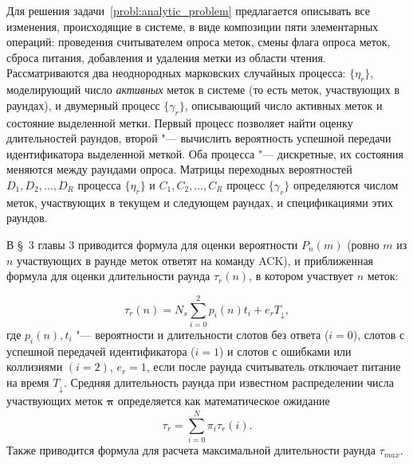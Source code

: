 Для решения задачи~\ref{probl:analytic_problem} предлагается описывать все изменения, происходящие в системе, в виде композиции пяти элементарных операций: проведения считывателем опроса меток, смены флага опроса меток, сброса питания, добавления и удаления метки из области чтения. Рассматриваются два неоднородных марковских случайных процесса: $\{ \eta_r \}$, моделирующий число \textit{активных} меток в системе (то есть меток, участвующих в раундах), и двумерный процесс $\{ \gamma_r \}$, описывающий число активных меток и состояние выделенной метки. Первый процесс позволяет найти оценку длительностей раундов, второй "--- вычислить вероятность успешной передачи идентификатора выделенной меткой. Оба процесса "--- дискретные, их состояния меняются между раундами опроса. Матрицы переходных вероятностей $D_1, D_2, \dots, D_R$ процесса $\{ \eta_r \}$ и $C_1, C_2, \dots, C_R$ процесс $\{ \gamma_r \}$ определяются числом меток, участвующих в текущем и следующем раундах, и спецификациями этих раундов.

В \S~3 главы 3 приводится формула для оценки вероятности $P_n(m)$  (ровно $m$ из $n$ участвующих в раунде меток ответят на команду ACK), и приближенная формула для оценки длительности раунда $\tau_r(n)$, в котором участвует $n$ меток:

\begin{equation}\label{eq:round_duration_of_n}
	\tau_r(n) = N_s \sum\limits_{i=0}^{2}p_i(n)t_i + e_r T_\downarrow,
\end{equation}
где $p_i(n), t_i$ "--- вероятности и длительности слотов без ответа ($i = 0$), слотов с успешной передачей идентификатора ($i = 1$) и слотов с ошибками или коллизиями $(i = 2)$, $e_r = 1$, если после раунда считыватель отключает питание на время $T_{\downarrow}$. Средняя длительность раунда при известном распределении числа участвующих меток $\bm{\pi}$ определяется как математическое ожидание
\begin{equation}\label{eq:avg_round_duration}
  \tau_r = \sum_{i = 0}^{\overline{N}} \pi_i \tau_r(i).
\end{equation}
Также приводится формула для расчета максимальной длительности раунда $\tau_{max}$.

